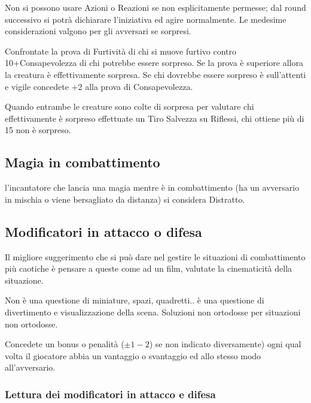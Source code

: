 \begin{multicols}{2}
Non si possono usare Azioni o Reazioni se non esplicitamente permesse; dal round successivo si potrà dichiarare l'iniziativa ed agire normalmente. Le medesime considerazioni valgono per gli avversari se sorpresi.

Confrontate la prova di Furtività di chi si muove furtivo contro 10+Consapevolezza di chi potrebbe essere sorpreso. Se la prova è superiore allora la creatura è effettivamente sorpresa. Se chi dovrebbe essere sorpreso è sull'attenti e vigile concedete +2 alla prova di Consapevolezza.

Quando entrambe le creature sono colte di sorpresa per valutare chi effettivamente è sorpreso effettuate un Tiro Salvezza su Riflessi, chi ottiene più di 15 non è sorpreso.

\subsection{Magia in combattimento}\label{magiaincombattimento}

l'incantatore che lancia una magia mentre è in combattimento (ha un avversario in mischia o viene bersagliato da distanza) si considera Distratto.

%

\subsection{Modificatori in attacco o difesa} \label{modificatoriattaccodifesaparticolari}

Il migliore suggerimento che si può dare nel gestire le situazioni di combattimento più caotiche è pensare a queste come ad un film, valutate la cinematicità della situazione.

Non è una questione di miniature, spazi, quadretti.. è una questione di divertimento e visualizzazione della scena. Soluzioni non ortodosse per situazioni non ortodosse.

Concedete un bonus o penalità ($\pm 1-2$) se non indicato diversamente) ogni qual volta il giocatore abbia un vantaggio o svantaggio ed allo stesso modo all'avversario.


\subsubsection{Lettura dei modificatori in attacco e difesa} \label{letturamodificatoriattaccodifesaparticolari}


\end{multicols}
